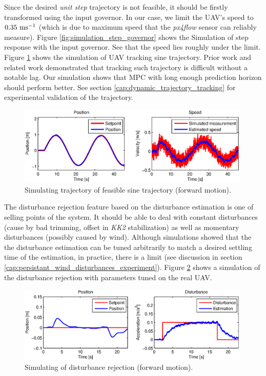 Since the desired \emph{unit step} trajectory is not feasible, it should be firstly transformed using the input governor. In our case, we limit the UAV's speed to $0.35~\mathrm{ms^{-1}}$ (which is due to maximum speed that the \emph{px4flow} sensor can reliably measure). Figure \ref{fig:simulation_step_governor} shows the Simulation of step response with the input governor. See that the speed lies roughly under the limit. Figure \ref{fig:simulation_sine} shows the simulation of UAV tracking sine trajectory. Prior work \citep{baca2013, endrych2014} and related work \citep{bangura2014realtimempc} demonstrated that tracking such trajectory is difficult without a notable lag. Our simulation shows that MPC with long enough prediction horizon should perform better. See section \ref{cap:dynamic_trajectory_tracking} for experimental validation of the trajectory.

\begin{figure}[H]
\centering
\includegraphics[width=0.99\textwidth]{fig/simulation3_sine.eps}
\caption{Simulating trajectory of feasible sine trajectory (forward motion).}
\label{fig:simulation_sine}
\end{figure}

The disturbance rejection feature based on the disturbance estimation is one of selling points of the system. It should be able to deal with constant disturbances (cause by bad trimming, offset in \emph{KK2} stabilization) as well as momentary disturbances (possibly caused by wind). Although simulations showed that the the disturbance estimation can be tuned arbitrarily to match a desired settling time of the estimation, in practice, there is a limit (see discussion in section \ref{cap:persistant_wind_disturbances_experiment}). Figure \ref{fig:simulation_disturbance_rejection} shows a simulation of the disturbance rejection with parameters tuned on the real UAV.

\begin{figure}[H]
\centering
\includegraphics[width=0.99\textwidth]{fig/simulation4_disturbance_rejection.eps}
\caption{Simulating of disturbance rejection (forward motion).}
\label{fig:simulation_disturbance_rejection}
\end{figure}

